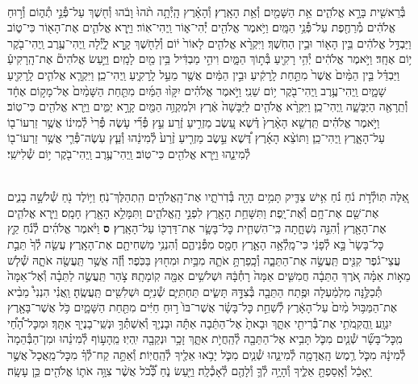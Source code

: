 \documentclass[twoside, openany, parskip=half, 11pt]{book}
\begin{document}
\begin{footnotesize}

\begin{multicols}{2}
\\
בְּ֯רֵאשִׁ֖ית בָּרָ֣א אֱלֹהִ֑ים אֵ֥ת הַשָּׁמַ֖יִם וְ֯אֵ֥ת הָאָֽרֶץ׃ וְ֯הָאָ֗רֶץ הָֽיְ֯תָ֥ה תֹ֨הוּ֙ וָבֹ֔הוּ וְ֯ח֖שֶׁךְ עַל־פְּ֯נֵ֣י תְ֯ה֑וֹם וְ֯ר֣וּחַ אֱלֹהִ֔ים מְ֯רַחֶ֖פֶת עַל־פְּ֯נֵ֥י הַמָּֽיִם׃ וַיֹּ֥אמֶר אֱלֹהִ֖ים יְ֯הִי־א֑וֹר וַֽיְהִי־אֽוֹר׃ וַיַּ֧רְא אֱלֹהִ֛ים אֶת־הָא֖וֹר כִּי־ט֑וֹב וַיַּבְדֵּ֣ל אֱלֹהִ֔ים בֵּ֥ין הָא֖וֹר וּבֵ֥ין הַחֹֽשֶׁךְ׃ וַיִּקְרָ֨א אֱלֹהִ֤ים לָאוֹר֙ י֔וֹם וְ֯לַחֹ֖שֶׁךְ קָ֣רָא לָ֑יְ֯לָה וַֽיְהִי־עֶ֥רֶב וַֽיְהִי־בֹ֖קֶר י֥וֹם אֶחָֽד׃
 וַיֹּ֣אמֶר אֱלֹהִ֔ים יְ֯הִ֥י רָקִ֖יעַ בְּ֯ת֣וֹךְ הַמָּ֑יִם וִיהִ֣י מַבְדִּ֔יל בֵּ֥ין מַ֖יִם לָמָֽיִם׃ וַיַּ֣עַשׂ אֱלֹהִים֘ אֶת־הָֽרָקִיעַ֒ וַיַּבְדֵּ֗ל בֵּ֤ין הַמַּ֨יִם֙ אֲשֶׁר֙ מִתַּ֣חַת לָֽרָקִ֔יעַ וּבֵ֣ין הַמַּ֔יִם אֲשֶׁ֖ר מֵעַ֣ל לָֽרָקִ֑יעַ וַֽיְהִי־כֵֽן׃ וַיִּקְרָ֧א אֱלֹהִ֛ים לָֽרָקִ֖יעַ שָׁמָ֑יִם וַֽיְהִי־עֶ֥רֶב וַֽיְהִי־בֹ֖קֶר י֥וֹם שֵׁנִֽי׃
וַיֹּ֣אמֶר אֱלֹהִ֗ים יִקָּו֨וּ הַמַּ֜יִם מִתַּ֤חַת הַשָּׁמַ֨יִם֙ אֶל־מָק֣וֹם אֶחָ֔ד וְ֯תֵֽרָאֶ֖ה הַיַּבָּשָׁ֑ה וַֽיְהִי־כֵֽן׃ וַיִּקְרָ֨א אֱלֹהִ֤ים לַיַּבָּשָׁה֙ אֶ֔רֶץ וּלְמִקְוֵ֥ה הַמַּ֖יִם קָרָ֣א יַמִּ֑ים וַיַּ֥רְא אֱלֹהִ֖ים כִּי־טֽוֹב׃ וַיֹּ֣אמֶר אֱלֹהִ֗ים תַּֽדְשֵׁ֤א הָאָ֨רֶץ֙ דֶּ֗שֶׁא עֵ֚שֶׂב מַזְרִ֣יעַ זֶ֔רַע עֵ֣ץ פְּ֯רִ֞י עֹ֤שֶׂה פְּ֯רִי֙ לְ֯מִינ֔וֹ אֲשֶׁ֥ר זַרְעוֹ־ב֖וֹ עַל־הָאָ֑רֶץ וַֽיְהִי־כֵֽן׃ וַתּוֹצֵ֨א הָאָ֜רֶץ דֶּ֠שֶׁא עֵ֣שֶׂב מַזְרִ֤יעַ זֶ֨רַע֙ לְ֯מִינֵ֔הוּ וְ֯עֵ֧ץ עֹֽשֶׂה־פְּ֯רִ֛י אֲשֶׁ֥ר זַרְעוֹ־ב֖וֹ לְ֯מִינֵ֑הוּ וַיַּ֥רְא אֱלֹהִ֖ים כִּי־טֽוֹב׃ וַֽיְהִי־עֶ֥רֶב וַֽיְהִי־בֹ֖קֶר י֥וֹם שְׁ֯לִישִֽׁי׃

\\
אֵ֚לֶּה תּֽוֹלְ֯דֹ֣ת נֹ֔חַ נֹ֗חַ אִ֥ישׁ צַדִּ֛יק תָּמִ֥ים הָיָ֖ה בְּ֯דֹֽרֹתָ֑יו אֶת־הָֽאֱלֹהִ֖ים הִֽתְהַלֶּךְ־נֹֽחַ׃ וַיּ֥וֹלֶד נֹ֖חַ שְׁ֯לֹשָׁ֣ה בָנִ֑ים אֶת־שֵׁ֖ם אֶת־חָ֥ם וְ֯אֶת־יָֽפֶת׃ וַתִּשָּׁחֵ֥ת הָאָ֖רֶץ לִפְנֵ֣י הָֽאֱלֹהִ֑ים וַתִּמָּלֵ֥א הָאָ֖רֶץ חָמָֽס׃ וַיַּ֧רְא אֱלֹהִ֛ים אֶת־הָאָ֖רֶץ וְ֯הִנֵּ֣ה נִשְׁחָ֑תָה כִּֽי־הִשְׁחִ֧ית כׇּל־בָּשָׂ֛ר אֶת־דַּרְכּ֖וֹ עַל־הָאָֽרֶץ׃ \textbf{ס} וַיֹּ֨אמֶר אֱלֹהִ֜ים לְ֯נֹ֗חַ קֵ֤ץ כׇּל־בָּשָׂר֙ בָּ֣א לְ֯פָנַ֔י כִּי־מָֽלְ֯אָ֥ה הָאָ֛רֶץ חָמָ֖ס מִפְּ֯נֵיהֶ֑ם וְ֯הִנְנִ֥י מַשְׁחִיתָ֖ם אֶת־הָאָֽרֶץ׃ עֲשֵׂ֤ה לְ֯ךָ֙ תֵּבַ֣ת עֲצֵי־גֹ֔פֶר קִנִּ֖ים תַּֽעֲשֶׂ֣ה אֶת־הַתֵּבָ֑ה וְ֯כָֽפַרְתָּ֥ אֹתָ֛הּ מִבַּ֥יִת וּמִח֖וּץ בַּכֹּֽפֶר׃ וְ֯זֶ֕ה אֲשֶׁ֥ר תַּֽעֲשֶׂ֖ה אֹתָ֑הּ שְׁ֯ל֧שׁ מֵא֣וֹת אַמָּ֗ה אֹ֚רֶךְ הַתֵּבָ֔ה חֲמִשִּׁ֤ים אַמָּה֙ רָחְ֯בָּ֔הּ וּשְׁלשִׁ֥ים אַמָּ֖ה קֽוֹמָתָֽהּ׃ צֹ֣הַר תַּֽעֲשֶׂ֣ה לַתֵּבָ֗ה וְ֯אֶל־אַמָּה֙ תְּ֯כַלֶּ֣נָּה מִלְמַ֔עְלָה וּפֶ֥תַח הַתֵּבָ֖ה בְּ֯צִדָּ֣הּ תָּשִׂ֑ים תַּחְתִּיִּ֛ם שְׁ֯נִיִּ֥ם וּשְׁלִשִׁ֖ים תַּֽעֲשֶֽׂהָ׃  וַֽאֲנִ֗י הִנְנִי֩ מֵבִ֨יא אֶת־הַמַּבּ֥וּל מַ֨יִם֙ עַל־הָאָ֔רֶץ לְ֯שַׁחֵ֣ת כׇּל־בָּשָׂ֗ר אֲשֶׁר־בּוֹ֙ ר֣וּחַ חַיִּ֔ים מִתַּ֖חַת הַשָּׁמָ֑יִם כֹּ֥ל אֲשֶׁר־בָּאָ֖רֶץ יִגְוָֽע׃ וַֽהֲקִֽמֹתִ֥י אֶת־בְּ֯רִיתִ֖י אִתָּ֑ךְ וּבָאתָ֙ אֶל־הַתֵּ֔בָה אַתָּ֕ה וּבָנֶי֛ךָ וְ֯אִשְׁתְּ֯ךָ֥ וּנְשֵֽׁי־בָנֶי֖ךָ אִתָּֽךְ׃ וּמִכׇּל־הָ֠חַ֠י מִֽכׇּל־בָּשָׂ֞ר שְׁ֯נַ֧יִם מִכֹּ֛ל תָּבִ֥יא אֶל־הַתֵּבָ֖ה לְ֯הַֽחֲיֹ֣ת אִתָּ֑ךְ זָכָ֥ר וּנְקֵבָ֖ה יִֽהְיֽוּ׃  מֵֽהָע֣וֹף לְ֯מִינֵ֗הוּ וּמִן־הַבְּ֯הֵמָה֙ לְ֯מִינָ֔הּ מִכֹּ֛ל רֶ֥מֶשׂ הָֽאֲדָמָ֖ה לְ֯מִינֵ֑הוּ שְׁ֯נַ֧יִם מִכֹּ֛ל יָבֹ֥אוּ אֵלֶ֖יךָ לְ֯הַֽחֲיֽוֹת׃ וְ֯אַתָּ֣ה קַח־לְ֯ךָ֗ מִכׇּל־מַֽאֲכָל֙ אֲשֶׁ֣ר יֵֽאָכֵ֔ל וְ֯אָֽסַפְתָּ֖ אֵלֶ֑יךָ וְ֯הָיָ֥ה לְ֯ךָ֛ וְ֯לָהֶ֖ם לְ֯אָכְ֯לָֽה׃ וַיַּ֖עַשׂ נֹ֑חַ כְּ֠֯כֹ֠ל אֲשֶׁ֨ר צִוָּ֥ה אֹת֛וֹ אֱלֹהִ֖ים כֵּ֥ן עָשָֽׂה׃


\end{multicols}
\end{footnotesize}
\end{document}
